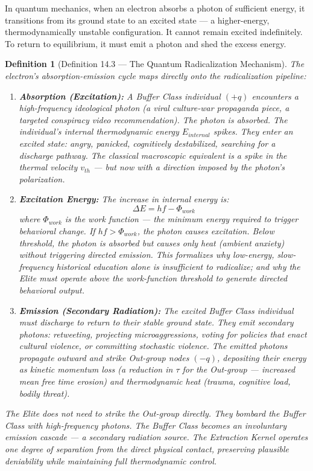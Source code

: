 \documentclass[12pt]{book}
\numberwithin{equation}{chapter}
\newtheorem{definition}{Definition}[chapter]
\begin{document}
    In quantum mechanics, when an electron absorbs a photon of sufficient energy, it transitions from its ground state to an excited state — a higher-energy, thermodynamically unstable configuration. It cannot remain excited indefinitely. To return to equilibrium, it must emit a photon and shed the excess energy.
  

\begin{definition}[Definition 14.3 — The Quantum Radicalization Mechanism]
The electron's absorption-emission cycle maps directly onto the radicalization pipeline:
    
\begin{enumerate}

\item 
\textbf{Absorption (Excitation):} A Buffer Class individual $(+q)$ encounters a high-frequency ideological photon (a viral culture-war propaganda piece, a targeted conspiracy video recommendation). The photon is absorbed. The individual's internal thermodynamic energy $E_{internal}$ spikes. They enter an excited state: angry, panicked, cognitively destabilized, searching for a discharge pathway. The classical macroscopic equivalent is a spike in the thermal velocity $v_{th}$ — but now with a direction imposed by the photon's polarization.
      

\item 
\textbf{Excitation Energy:} The increase in internal energy is:
          \[ \Delta E = hf - \Phi_{work} \]
        where $\Phi_{work}$ is the work function — the minimum energy required to trigger behavioral change. If $hf > \Phi_{work}$, the photon causes excitation. Below threshold, the photon is absorbed but causes only heat (ambient anxiety) without triggering directed emission. This formalizes why low-energy, slow-frequency historical education alone is insufficient to radicalize; and why the Elite must operate above the work-function threshold to generate directed behavioral output.
      

\item 
\textbf{Emission (Secondary Radiation):} The excited Buffer Class individual must discharge to return to their stable ground state. They emit secondary photons: retweeting, projecting microaggressions, voting for policies that enact cultural violence, or committing stochastic violence. The emitted photons propagate outward and strike Out-group nodes $(-q)$, depositing their energy as kinetic momentum loss (a reduction in $\tau$ for the Out-group — increased mean free time erosion) and thermodynamic heat (trauma, cognitive load, bodily threat).
      

\end{enumerate}

    The Elite does not need to strike the Out-group directly. They bombard the Buffer Class with high-frequency photons. The Buffer Class becomes an involuntary emission cascade — a secondary radiation source. The Extraction Kernel operates one degree of separation from the direct physical contact, preserving plausible deniability while maintaining full thermodynamic control.
  \end{definition}
\end{document}

